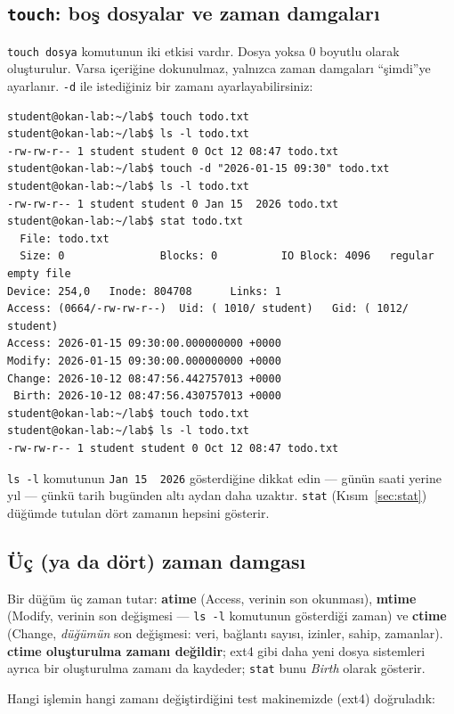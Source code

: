 \documentclass[11pt,a4paper]{article}
\newcommand{\term}[1]{\textbf{\color{mintdeep}#1}}
\newcommand{\cmd}[1]{\texttt{#1}}
\begin{document}
\subsection{\texttt{touch}: boş dosyalar ve zaman damgaları}

\cmd{touch dosya} komutunun iki etkisi vardır. Dosya yoksa $0$ boyutlu olarak oluşturulur. Varsa içeriğine dokunulmaz, yalnızca zaman damgaları ``şimdi''ye ayarlanır. \cmd{-d} ile istediğiniz bir zamanı ayarlayabilirsiniz:

\begin{lstlisting}[style=term]
student@okan-lab:~/lab$ touch todo.txt
student@okan-lab:~/lab$ ls -l todo.txt
-rw-rw-r-- 1 student student 0 Oct 12 08:47 todo.txt
student@okan-lab:~/lab$ touch -d "2026-01-15 09:30" todo.txt
student@okan-lab:~/lab$ ls -l todo.txt
-rw-rw-r-- 1 student student 0 Jan 15  2026 todo.txt
student@okan-lab:~/lab$ stat todo.txt
  File: todo.txt
  Size: 0               Blocks: 0          IO Block: 4096   regular empty file
Device: 254,0   Inode: 804708      Links: 1
Access: (0664/-rw-rw-r--)  Uid: ( 1010/ student)   Gid: ( 1012/ student)
Access: 2026-01-15 09:30:00.000000000 +0000
Modify: 2026-01-15 09:30:00.000000000 +0000
Change: 2026-10-12 08:47:56.442757013 +0000
 Birth: 2026-10-12 08:47:56.430757013 +0000
student@okan-lab:~/lab$ touch todo.txt
student@okan-lab:~/lab$ ls -l todo.txt
-rw-rw-r-- 1 student student 0 Oct 12 08:47 todo.txt
\end{lstlisting}

\cmd{ls -l} komutunun \texttt{Jan 15\ \ 2026} gösterdiğine dikkat edin --- günün saati yerine yıl --- çünkü tarih bugünden altı aydan daha uzaktır. \cmd{stat} (Kısım~\ref{sec:stat}) düğümde tutulan dört zamanın hepsini gösterir.

\subsection{Üç (ya da dört) zaman damgası}

Bir düğüm üç zaman tutar: \term{atime} (Access, verinin son okunması), \term{mtime} (Modify, verinin son değişmesi --- \cmd{ls -l} komutunun gösterdiği zaman) ve \term{ctime} (Change, \emph{düğümün} son değişmesi: veri, bağlantı sayısı, izinler, sahip, zamanlar). \textbf{ctime oluşturulma zamanı değildir}; ext4 gibi daha yeni dosya sistemleri ayrıca bir oluşturulma zamanı da kaydeder; \cmd{stat} bunu \emph{Birth} olarak gösterir.

Hangi işlemin hangi zamanı değiştirdiğini test makinemizde (ext4) doğruladık:
\end{document}

